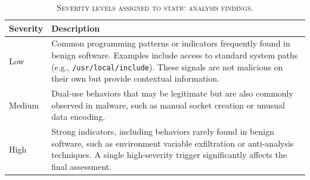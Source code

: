 \begin{table}[!t]
\centering
\caption{\textsc{Severity levels assigned to static analysis findings.}}
\small
\renewcommand{\arraystretch}{1.2}
\begin{tabularx}{\columnwidth}{>{\centering\arraybackslash}p{1.4cm}>{\RaggedRight\arraybackslash}X}
\toprule
\textbf{Severity} & \textbf{Description} \\
\midrule
Low &
Common programming patterns or indicators frequently found in benign software. Examples include access to standard system paths (e.g., \texttt{/usr/local/include}). These signals are not malicious on their own but provide contextual information. \\

\rowcolor[HTML]{F2F2F2}
Medium &
Dual-use behaviors that may be legitimate but are also commonly observed in malware, such as manual socket creation or unusual data encoding. \\

High &
Strong indicators, including behaviors rarely found in benign software, such as environment variable exfiltration or anti-analysis techniques. A single high-severity trigger significantly affects the final assessment. \\
\bottomrule
\end{tabularx}
\label{tab:severity_levels}
\end{table}




